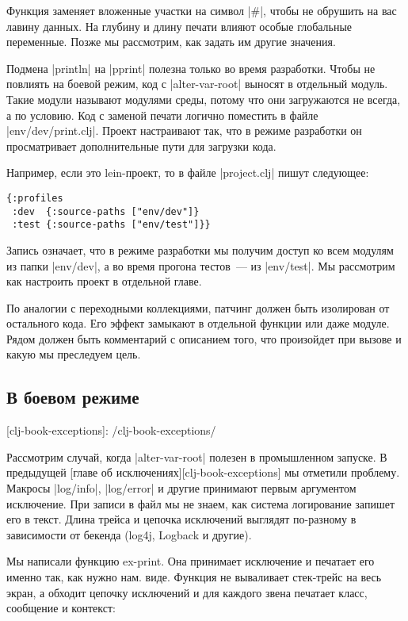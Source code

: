 Функция заменяет вложенные участки на символ \spverb|#|, чтобы не обрушить на вас лавину
данных. На глубину и длину печати влияют особые глобальные переменные. Позже мы
рассмотрим, как задать им другие значения.

Подмена \spverb|println| на \spverb|pprint| полезна только во время разработки. Чтобы не
повлиять на боевой режим, код с \spverb|alter-var-root| выносят в отдельный
модуль. Такие модули называют модулями среды, потому что они загружаются не
всегда, а по условию. Код с заменой печати логично поместить в файле
\spverb|env/dev/print.clj|. Проект настраивают так, что в режиме разработки он
просматривает дополнительные пути для загрузки кода.

Например, если это lein-проект, то в файле \spverb|project.clj| пишут следующее:

\begin{verbatim}
{:profiles
 :dev  {:source-paths ["env/dev"]}
 :test {:source-paths ["env/test"]}}
\end{verbatim}

Запись означает, что в режиме разработки мы получим доступ ко всем модулям из
папки \spverb|env/dev|, а во время прогона тестов~--- из \spverb|env/test|. Мы рассмотрим как
настроить проект в отдельной главе.

По аналогии с переходными коллекциями, патчинг должен быть изолирован от
остального кода. Его эффект замыкают в отдельной функции или даже модуле. Рядом
должен быть комментарий с описанием того, что произойдет при вызове и какую мы
преследуем цель.

\subsection{В боевом режиме}

[clj-book-exceptions]: /clj-book-exceptions/

Рассмотрим случай, когда \spverb|alter-var-root| полезен в промышленном запуске. В
предыдущей [главе об исключениях][clj-book-exceptions] мы отметили
проблему. Макросы \spverb|log/info|, \spverb|log/error| и другие принимают первым аргументом
исключение. При записи в файл мы не знаем, как система логирование запишет его в
текст. Длина трейса и цепочка исключений выглядят по-разному в зависимости от
бекенда (log4j, Logback и другие).

Мы написали функцию ex-print. Она принимает исключение и печатает его именно
так, как нужно нам. виде. Функция не вываливает стек-трейс на весь экран, а
обходит цепочку исключений и для каждого звена печатает класс, сообщение и
контекст:

